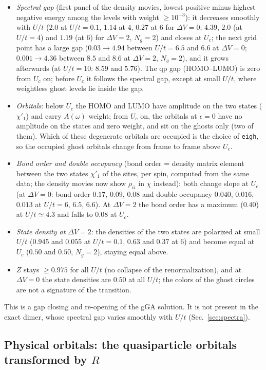 \documentclass[11pt]{article}
\newcommand{\Ng}{N_{g}}
\newcommand{\dV}{\Delta V}
\begin{document}
\begin{itemize}[nosep]
  \item \emph{Spectral gap} (first panel of the density movies, lowest positive minus highest negative energy among the levels with weight $\ge10^{-3}$): it decreases smoothly with $U/t$
  ($2.0$ at $U/t=0.1$, $1.14$ at $4$, $0.27$ at $6$ for $\dV=0$; $4.39$, $2.0$ (at $U/t=4$) and $1.19$ (at $6$) for $\dV=2$, $\Ng=2$) and closes at $U_c$; the next grid point has a large gap
  ($0.03\to4.94$ between $U/t=6.5$ and $6.6$ at $\dV=0$; $0.001\to4.36$ between $8.5$ and $8.6$ at $\dV=2$, $\Ng=2$), and it grows afterwards (at $U/t=10$: $8.59$ and $5.76$).
  The qp gap (HOMO--LUMO) is zero from $U_c$ on; before $U_c$ it follows the spectral gap, except at small $U/t$, where weightless ghost levels lie inside the gap.
  \item \emph{Orbitals}: below $U_c$ the HOMO and LUMO have amplitude on the two states ($\chi'_1$) and carry $A(\omega)$ weight; from $U_c$ on, the orbitals at $\epsilon=0$ have no amplitude on the states and zero weight, and sit on the ghosts only
  (two of them). Which of these degenerate orbitals are occupied is the choice of \texttt{eigh}, so the occupied ghost orbitals change from frame to frame above $U_c$.
  \item \emph{Bond order and double occupancy} (bond order = density matrix element between the two states $\chi'_1$ of the sites, per spin, computed from the same data; the density movies now show $\rho_{ii}$ in $\chi$ instead): both change slope at $U_c$ (at $\dV=0$: bond order $0.17$, $0.09$, $0.08$ and double occupancy $0.040$, $0.016$, $0.013$ at $U/t=6$, $6.5$, $6.6$).
  At $\dV=2$ the bond order has a maximum ($0.40$) at $U/t\simeq4.3$ and falls to $0.08$ at $U_c$.
  \item \emph{State density at $\dV=2$}: the densities of the two states are polarized at small $U/t$ ($0.945$ and $0.055$ at $U/t=0.1$, $0.63$ and $0.37$ at $6$) and become equal at $U_c$ ($0.50$ and $0.50$, $\Ng=2$), staying equal above.
  \item $Z$ stays $\ge0.975$ for all $U/t$ (no collapse of the renormalization), and at $\dV=0$ the state densities are $0.50$ at all $U/t$; the colors of the ghost circles are not a signature of the transition.
\end{itemize}
This is a gap closing and re-opening of the gGA solution. It is not present in the exact dimer, whose spectral gap varies smoothly with $U/t$ (Sec.~\ref{sec:spectra}).

\subsection{Physical orbitals: the quasiparticle orbitals transformed by $R$}
\label{sec:physorb}
\end{document}
